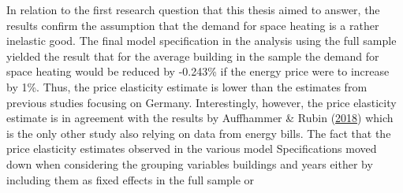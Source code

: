 \documentclass[12pt,twoside]{reedthesis}
\begin{document}
In relation to the first research question that this thesis aimed to answer, the results confirm the assumption that the demand for space heating is a rather inelastic good. The final model specification in the analysis using the full sample yielded the result that for the average building in the sample the demand for space heating would be reduced by -0.243\% if the energy price were to increase by 1\%. Thus, the price elasticity estimate is lower than the estimates from previous studies focusing on Germany. Interestingly, however, the price elasticity estimate is in agreement with the results by Auffhammer \& Rubin (\protect\hyperlink{ref-auffhammer_rubin18}{2018}) which is the only other study also relying on data from energy bills. The fact that the price elasticity estimates observed in the various model Specifications moved down when considering the grouping variables buildings and years either by including them as fixed effects in the full sample or
\end{document}
